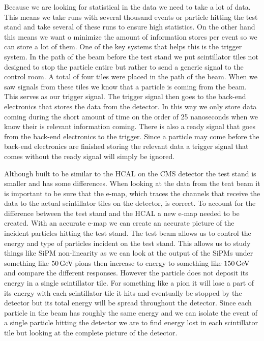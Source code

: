 Because we are looking for statistical in the data we need to take a lot of data. This means we take runs with several thousand events or particle hitting the test stand and take several of these runs to ensure high statistics. On the other hand this means we want o minimize the amount of information stores per event so we can store a lot of them. One of the key systems that helps this is the trigger system. In the path of the beam before the test stand we put scintillator tiles not designed to stop the particle entire but rather to send a generic signal to the control room. A total of four tiles were placed in the path of the beam. When we saw signals from these tiles we know that a particle is coming from the beam. This serves as our trigger signal. The trigger signal then goes to the back-end electronics that stores the data from the detector. In this way we only store data coming during the short amount of time on the order of 25 nanoseconds when we know their is relevant information coming. There is also a ready signal that goes from the back-end electronics to the trigger. Since a particle may come before the back-end electronics are finished storing the relevant data a trigger signal that comes without the ready signal will simply be ignored.

Although built to be similar to the HCAL on the CMS detector the test stand is smaller and has some differences. When looking at the data from the teat beam it is important to be sure that the e-map, which traces the channels that receive the data to the actual scintillator tiles on the detector, is correct. To account for the difference between the test stand and the HCAL a new e-map needed to be created. With an accurate e-map we can create an accurate picture of the incident particles hitting the test stand. The test beam allows us to control the energy and type of particles incident on the test stand. This allows us to study things like SiPM non-linearity as we can look at the output of the SiPMs under something like $50 {\,\text{Ge\hspace{-.08em}V\hspace{-0.16em}}}$ pions then increase to energy to something like $150 {\,\text{Ge\hspace{-.08em}V\hspace{-0.16em}}}$ and compare the different responses. However the particle does not deposit its energy in a single scintillator tile. For something like a pion it will lose a part of its energy with each scintillator tile it hits and eventually be stopped by the detector but its total energy will be spread throughout the detector. Since each particle in the beam has roughly the same energy and we can isolate the event of a single particle hitting the detector we are to find energy lost in each scintillator tile but looking at the complete picture of the detector. 

